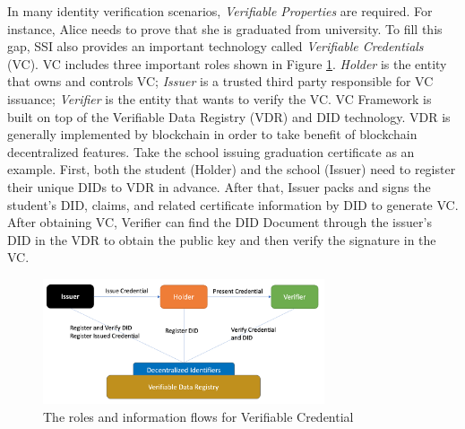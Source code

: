 \documentclass[conference, dvipdfmx]{IEEEtran} %
\begin{document}
\begin{sloppypar}
In many identity verification scenarios, \textit{Verifiable Properties} are required. For instance, Alice needs to prove that she is graduated from university.  To fill this gap, SSI also provides an important technology called \textit{Verifiable Credentials} (VC). VC includes three important roles shown in Figure \ref{fig:vc_framework}. \textit{Holder} is the entity that owns and controls VC; \textit{Issuer} is a trusted third party responsible for VC issuance; \textit{Verifier} is the entity that wants to verify the VC. VC Framework is built on top of the Verifiable Data Registry (VDR) and DID technology. VDR is generally implemented by blockchain in order to take benefit of blockchain decentralized features. Take the school issuing graduation certificate as an example. First, both the student (Holder) and the school (Issuer) need to register their unique DIDs to VDR in advance. After that, Issuer packs and signs the student's DID, claims, and related certificate information by DID to generate VC. After obtaining VC, Verifier can find the DID Document through the issuer's DID in the VDR to obtain the public key and then verify the signature in the VC.


\begin{figure}[ht] %
  \centering  
  \includegraphics[width=83mm]{images/vc_framework.png} %
  \caption{The roles and information flows for Verifiable Credential} %
  \label{fig:vc_framework} %
\end{figure}



\end{sloppypar}
\end{document}
